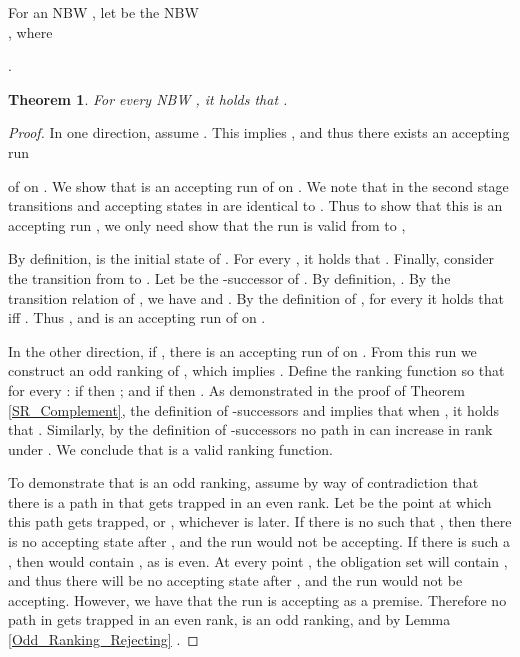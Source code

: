 \documentclass{LMCS}
\newtheorem{theorem}{Theorem}[section]
\begin{document}
\begin{defi}\label{Symbolic_DetLim}
For an NBW , let  be the NBW\\
, where
\begin{iteMize}{}
\item .
\item 
\end{iteMize}
\end{defi}

\begin{theorem}\label{Symb_Complement}
For every NBW , it holds that .
\end{theorem}
\begin{proof}
In one direction, assume . This implies , and thus there exists an
accepting run

of  on . We show that 
is an accepting run of  on . We note that in the second stage transitions and
accepting states in  are identical to . Thus to show that this is an accepting run
, we only need show that the run is valid from  to ,

By definition,  is the initial state of . For every , it holds that . Finally, consider the transition
from  to . Let  be
the -successor of .  By definition, . 
By the transition relation of ,  we have
 and .  By the definition of
, for every  it holds that  iff .
Thus 
, and
 is an accepting run of
 on . 

In the other direction,  if , there is an accepting run
  of  on .
From this run we construct an odd ranking of , which implies .  Define
the ranking function  so that for every : if  then
; and if  then
.  As demonstrated in the proof of Theorem \ref{SR_Complement}, the
definition of -successors and  implies that when , it holds that . Similarly, by the definition of -successors no path in  can increase in rank under
. We conclude that  is a valid ranking function.

To demonstrate that  is an odd ranking, assume by way of
contradiction that there is a path  in 
that gets trapped in an even rank.  Let  be the point at which this path
gets trapped, or , whichever is later. If there is no  such that
, then there is no accepting state after , and the run
would not be accepting. If there is such a , then  would contain
, as  is even. At every point , the
obligation set will contain , and thus there will be no accepting
state after , and the run would not be accepting.  However, we have that
the run is accepting as a premise. Therefore no path in  gets trapped in
an even rank,  is an odd ranking, and by Lemma \ref{Odd_Ranking_Rejecting} .
\end{proof}
\end{document}
